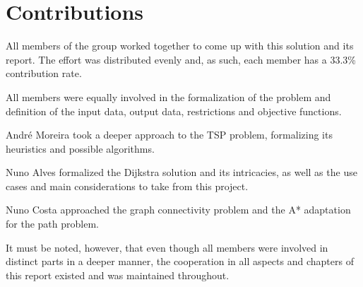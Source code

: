 \documentclass[a4paper, 12pt]{report}
\begin{document}
    \pagebreak
    
    \chapter{Contributions}
    
    All members of the group worked together to come up with this solution and its report. The effort was distributed evenly and, as such, each member has a 33.3\% contribution rate. 
    
    All members were equally involved in the formalization of the problem and definition of the input data, output data, restrictions and objective functions.
    
    André Moreira took a deeper approach to the TSP problem, formalizing its heuristics and possible algorithms.
    
    Nuno Alves formalized the Dijkstra solution and its intricacies, as well as the use cases and main considerations to take from this project.
    
    Nuno Costa approached the graph connectivity problem and the A* adaptation for the path problem.
    
    It must be noted, however, that even though all members were involved in distinct parts in a deeper manner, the cooperation in all aspects and chapters of this report existed and was maintained throughout. 
    
    \pagebreak
    
    \printbibliography
    
\end{document}
